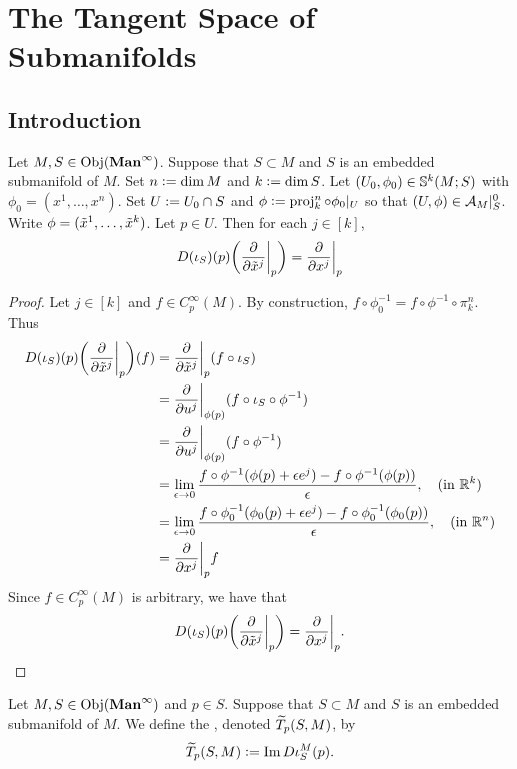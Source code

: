 \documentclass{book}
\begin{document}
	
	
	
	\newpage
	\section{The Tangent Space of Submanifolds}
	
	\subsection{Introduction}
	
	\begin{ex} 
		Let $M, S \in \Obj(\Maninf)$. Suppose that $S \subset M$ and $S$ is an embedded submanifold of $M$. Set $n \defeq \dim M$ and $k \defeq \dim S$. Let $(U_0, \phi_0) \in \S^k(M;S)$ with $\phi_0 = (x^1, \ldots, x^n)$. Set $U \defeq U_0 \cap S$ and $\phi \defeq \prj^n_k \circ \phi_0|_U$ so that $(U, \phi) \in \MA_M|_S^0$. Write $\phi = (\tl{x}^1, \ldots, \tl{x}^k)$. Let $p \in U$. Then for each $j \in [k]$, 
		$$D(\iota_S)(p)\bigg(\frac{\p }{\p \tl{x}^j}\bigg|_p \bigg) = \frac{\p }{\p x^j} \bigg|_p$$
	\end{ex}

	\begin{proof}
		Let $j \in [k]$ and $f \in C^{\infty}_p(M)$. By construction, $f \circ \phi_0^{-1} = f \circ \phi^{-1} \circ \pi^n_k$. Thus
		\begin{align*}
			D(\iota_S)(p)\bigg(\frac{\p }{\p \tl{x}^j}\bigg|_p \bigg) (f)
			& = \frac{\p }{\p \tl{x}^j}\bigg|_p(f \circ \iota_S) \\
			& = \frac{\p }{\p u^j}\bigg|_{\phi(p)} (f \circ \iota_S \circ \phi^{-1} ) \\
			& = \frac{\p }{\p u^j}\bigg|_{\phi(p)} (f \circ \phi^{-1} ) \\
			& = \lim_{\ep \rightarrow 0} \frac{f \circ \phi^{-1}(\phi(p) + \ep e^j) - f \circ \phi^{-1}(\phi(p)) }{ \ep} , \quad \text{(in $\R^k$)} \\
			& = \lim_{\ep \rightarrow 0} \frac{f \circ \phi_0^{-1}(\phi_0(p) + \ep e^j) - f \circ \phi_0^{-1}(\phi_0(p)) }{ \ep} , \quad \text{(in $\R^n$)}  \\
			& = \frac{\p }{\p x ^j} \bigg|_p f
		\end{align*}
		Since $f \in C^{\infty}_p(M)$ is arbitrary, we have that 
		$$D(\iota_S)(p)\bigg(\frac{\p }{\p \tl{x}^j}\bigg|_p \bigg) = \frac{\p }{\p x ^j} \bigg|_p.$$
	\end{proof}

	\begin{defn}
		Let $M, S \in \Obj(\Maninf)$ and $p \in S$. Suppose that $S \subset M$ and $S$ is an embedded submanifold of $M$. We define the , denoted $\wt{T}_p (S, M)$, by 
		$$\wt{T}_p (S, M) \defeq \Im D \iota^M_S(p).$$
	\end{defn}
\end{document}
